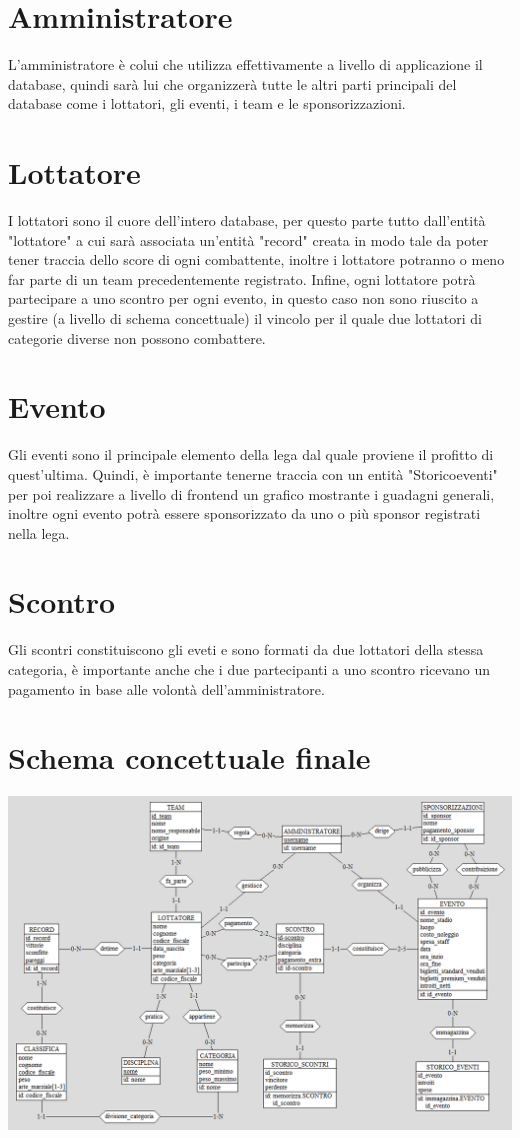\documentclass[a4paper,12pt]{report}
\begin{document}
\section{Amministratore}
L'amministratore è colui che utilizza effettivamente a livello di applicazione il database, quindi sarà lui che organizzerà tutte  
le altri parti principali del database come i lottatori, gli eventi, i team e le sponsorizzazioni.

\section{Lottatore}
I lottatori sono il cuore dell'intero database, per questo parte tutto dall'entità "lottatore" a cui sarà associata un'entità 
"record" creata in modo tale da poter tener traccia dello score di ogni combattente, inoltre i lottatore potranno o meno far parte 
di un team precedentemente registrato. Infine, ogni lottatore potrà partecipare a uno scontro per ogni evento, 
in questo caso non sono riuscito a gestire (a livello di schema concettuale) il vincolo per il quale due lottatori 
di categorie diverse non possono combattere.

\section{Evento}
Gli eventi sono il principale elemento della lega dal quale proviene il profitto di quest'ultima. Quindi, è importante 
tenerne traccia con un entità "Storico\textunderscore eventi" per poi realizzare a livello di frontend un grafico mostrante 
i guadagni generali, inoltre ogni evento potrà essere sponsorizzato da uno o più sponsor registrati nella lega.

\section{Scontro}
Gli scontri constituiscono gli eveti e sono formati da due lottatori della stessa categoria, è importante anche che i due partecipanti 
a uno scontro ricevano un pagamento in base alle volontà dell'amministratore.

\section{Schema concettuale finale}
\includegraphics[scale=0.8, angle=90]{./img/schema_finale.png}
\end{document}
